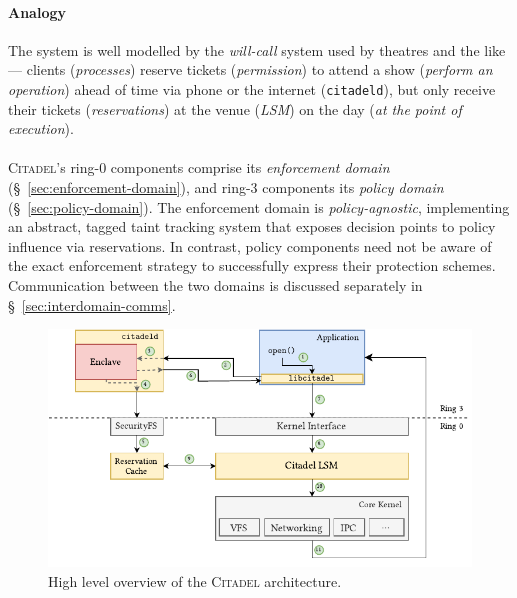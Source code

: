 \paragraph{Analogy} The system is well modelled by the \textit{will-call} system used by theatres and the like --- clients (\textit{processes}) reserve tickets (\textit{permission}) to attend a show (\textit{perform an operation}) ahead of time via phone or the internet (\texttt{citadeld}), but only receive their tickets (\textit{reservations}) at the venue (\textit{LSM}) on the day (\textit{at the point of execution}).

\paragraph{} \textsc{Citadel}'s ring-0 components comprise its \textit{enforcement domain} (§~\ref{sec:enforcement-domain}), and ring-3 components its \textit{policy domain} (§~\ref{sec:policy-domain}). The enforcement domain is \textit{policy-agnostic}, implementing an abstract, tagged taint tracking system that exposes decision points to policy influence via reservations. In contrast, policy components need not be aware of the exact enforcement strategy to successfully express their protection schemes. Communication between the two domains is discussed separately in §~\ref{sec:interdomain-comms}.



\begin{figure}[]
    \centering
    \includegraphics[width=\linewidth]{figures/OverallArchitecture.pdf}
    \caption{High level overview of the \textsc{Citadel} architecture.}
    \vspace{-5mm}
    \label{fig:citadel-overview}
    \vspace{5mm}
\end{figure}



